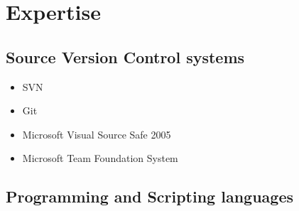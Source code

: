 \documentclass[12pt,a4paper]{article}
\begin{document}
\section{Expertise}
	\subsection{Source Version Control systems}
		\begin{itemize}
			\item SVN
			\item Git
			\item Microsoft Visual Source Safe 2005
			\item Microsoft Team Foundation System
		\end{itemize}
	\subsection{Programming and Scripting languages}
\end{document}

